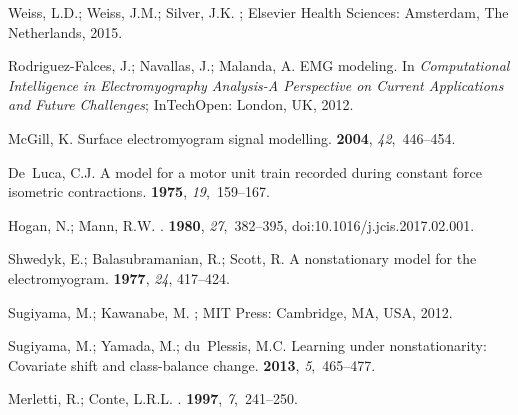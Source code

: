 \documentclass[sensors,review,accept,moreauthors,pdftex]{Definitions/mdpi}
\begin{document}
\begin{thebibliography}{999}
Weiss, L.D.; Weiss, J.M.; Silver, J.K.
; Elsevier Health Sciences:  Amsterdam, The Netherlands,   2015.

Rodriguez-Falces, J.; Navallas, J.; Malanda, A.
\newblock EMG modeling. In {\em Computational Intelligence in Electromyography
  Analysis-A Perspective on Current Applications and Future Challenges};
  InTechOpen: London, UK,   2012.

McGill, K.
\newblock Surface electromyogram signal modelling.
 {\bf 2004},
  {\em 42},~446--454.

De~Luca, C.J.
\newblock A model for a motor unit train recorded during constant force
  isometric contractions.
 {\bf 1975}, {\em 19},~159--167.

Hogan, N.; Mann, R.W.
.
 {\bf 1980}, {\em
  27},~382--395, doi:10.1016/j.jcis.2017.02.001.

Shwedyk, E.; Balasubramanian, R.; Scott, R.
\newblock A nonstationary model for the electromyogram.
 {\bf 1977}, \emph{24}, 
  417--424.

Sugiyama, M.; Kawanabe, M.
; MIT Press:  Cambridge, MA, USA,   2012.

Sugiyama, M.; Yamada, M.; du~Plessis, M.C.
\newblock Learning under nonstationarity: Covariate shift and class-balance
  change.
 {\bf
  2013}, {\em 5},~465--477.

Merletti, R.; Conte, L.R.L.
.
 {\bf 1997}, {\em
  7},~241--250.


\end{thebibliography}
\end{document}

